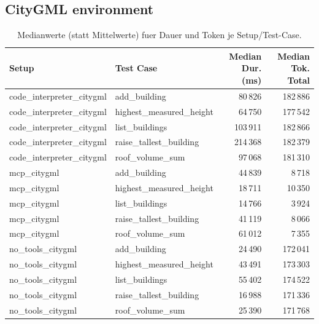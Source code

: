 \subsection*{CityGML environment}
\begin{table}[H]
\centering
\scriptsize
\begin{tabular}{l l r r}
\toprule
Setup & Test Case & Median Dur. (ms) & Median Tok. Total \\
\midrule
code\_interpreter\_citygml & add\_building & 80\,826 & 182\,886 \\
code\_interpreter\_citygml & highest\_measured\_height & 64\,750 & 177\,542 \\
code\_interpreter\_citygml & list\_buildings & 103\,911 & 182\,866 \\
code\_interpreter\_citygml & raise\_tallest\_building & 214\,368 & 182\,379 \\
code\_interpreter\_citygml & roof\_volume\_sum & 97\,068 & 181\,310 \\
\midrule
mcp\_citygml & add\_building & 44\,839 & 8\,718 \\
mcp\_citygml & highest\_measured\_height & 18\,711 & 10\,350 \\
mcp\_citygml & list\_buildings & 14\,766 & 3\,924 \\
mcp\_citygml & raise\_tallest\_building & 41\,119 & 8\,066 \\
mcp\_citygml & roof\_volume\_sum & 61\,012 & 7\,355 \\
\midrule
no\_tools\_citygml & add\_building & 24\,490 & 172\,041 \\
no\_tools\_citygml & highest\_measured\_height & 43\,491 & 173\,303 \\
no\_tools\_citygml & list\_buildings & 55\,402 & 174\,522 \\
no\_tools\_citygml & raise\_tallest\_building & 16\,988 & 171\,336 \\
no\_tools\_citygml & roof\_volume\_sum & 25\,390 & 171\,768 \\
\bottomrule
\end{tabular}
\caption{Medianwerte (statt Mittelwerte) fuer Dauer und Token je Setup/Test-Case.}
\end{table}
